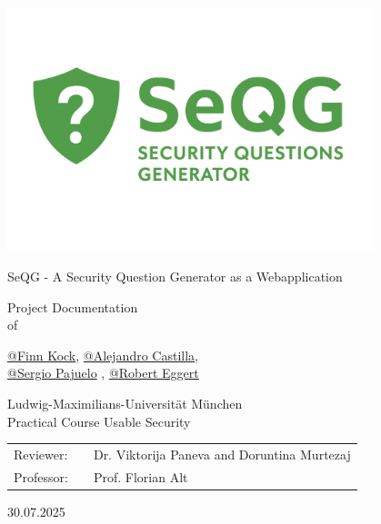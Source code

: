 \documentclass{thesisclass}
\makeatletter
\newcommand{\type}{Project Documentation}
\newcommand{\group}{\href{https://github.com/finnkock}{@Finn Kock}, \href{https://github.com/alecasbar}{@Alejandro Castilla}, \\
					\href{https://github.com/sergioPajuelo}{@Sergio Pajuelo} , \href{https://github.com/RobertEggert}{@Robert Eggert}}
\newcommand{\mytitle}{SeQG - A Security Question Generator as a Webapplication}
\newcommand{\course}{Practical Course Usable Security}
\newcommand{\reviewerone}{Dr. Viktorija Paneva and Doruntina Murtezaj}
\newcommand{\prof}{Prof. Florian Alt}
\newcommand{\timeend}{30.07.2025}
\makeatother
\begin{document}
\begin{titlepage}
    \centering

    \includegraphics[width=0.8\textwidth]{Documentation-Paper/images/logoandtext.png}

    \vspace{0.8cm}


    \Huge{\mytitle}
    \vspace{0.8cm} %

    \Large{
        \type\\of
    }

    \vspace{0.5cm} %

    \huge{\group}

    \vspace{0.5cm} %

    \Large{
        Ludwig-Maximilians-Universität München \\
        \course
    }

    \vspace{0.8cm} %

    \Large{
        \begin{tabular}[ht]{l c l}
            Reviewer: & \hfill & \reviewerone \\
            Professor: & \hfill & \prof
        \end{tabular}
    }

    \vspace{0.8cm} %

    \Large{\timeend}

\end{titlepage}

\renewcommand{\contentsname}{Index}
\tableofcontents
\clearpage





\end{document}
